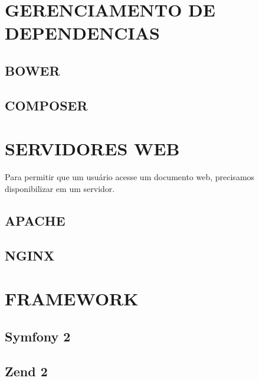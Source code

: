 \documentclass[12pt,floatnumber=continuous,espaco=umemeio]{abnt}
\begin{document}
	
	\capa 
	\folhaderosto 
	
	
  
	
	\indices

	
	
	
	
	
	
	
	
	
	
	\chapter{GERENCIAMENTO DE DEPENDENCIAS}
	\section{BOWER}
	\section{COMPOSER}
	
	\chapter{SERVIDORES WEB}
	Para permitir que um usuário acesse um documento web, precisamos disponibilizar
	em um servidor. %
	\section{APACHE}
	\section{NGINX}
	
	\chapter{FRAMEWORK}
	\section{Symfony 2}
	\section{Zend 2}
	
	
	
	 
	
\end{document}
